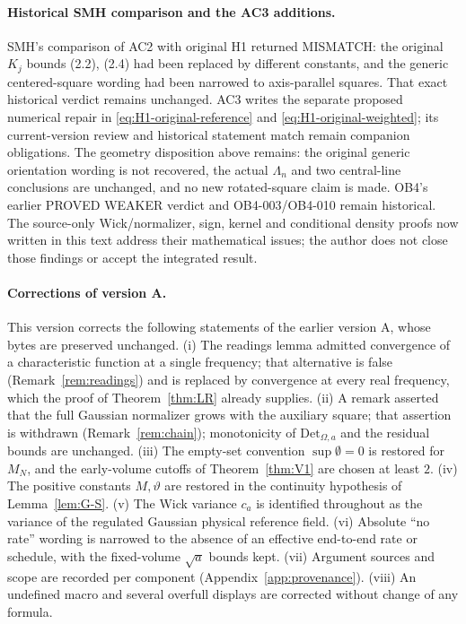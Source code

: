 \documentclass[11pt]{article}
\theoremstyle{plain}
\theoremstyle{definition}
\theoremstyle{remark}
\newcommand{\Det}{\mathrm{Det}}
\begin{document}
\paragraph{Historical SMH comparison and the AC3 additions.}
SMH's comparison of AC2 with original H1 returned MISMATCH: the original
$K_j$ bounds (2.2), (2.4) had been replaced by different constants, and
the generic centered-square wording had been narrowed to axis-parallel
squares. That exact historical verdict remains unchanged. AC3 writes the
separate proposed numerical repair in
\eqref{eq:H1-original-reference} and \eqref{eq:H1-original-weighted}; its
current-version review and historical statement match remain companion
obligations. The geometry disposition above remains: the original generic
orientation wording is not recovered, the actual $\Lambda_n$ and two
central-line conclusions are unchanged, and no new rotated-square claim
is made. OB4's earlier PROVED WEAKER verdict and OB4-003/OB4-010 remain
historical. The source-only Wick/normalizer, sign, kernel and conditional
density proofs now written in this text address their mathematical issues;
the author does not close those findings or accept the integrated result.

\paragraph{Corrections of version A.} This version corrects the following
statements of the earlier version A, whose bytes are preserved unchanged. (i) The
readings lemma admitted convergence of a characteristic function at a single
frequency; that alternative is false (Remark~\ref{rem:readings}) and is replaced by
convergence at every real frequency, which the proof of Theorem~\ref{thm:LR}
already supplies. (ii) A remark asserted that the full Gaussian normalizer grows
with the auxiliary square; that assertion is withdrawn
(Remark~\ref{rem:chain}); monotonicity of $\Det_{\Omega,a}$ and the residual bounds are
unchanged. (iii) The empty-set convention $\sup\emptyset=0$ is restored for $M_N$, and the
early-volume cutoffs of Theorem~\ref{thm:V1} are chosen at least $2$. (iv) The
positive constants $M,\vartheta$ are restored in the continuity hypothesis of
Lemma~\ref{lem:G-S}. (v) The Wick variance $c_a$ is identified throughout as the
variance of the regulated Gaussian physical reference field. (vi) Absolute
``no rate'' wording is narrowed to the absence of an effective end-to-end rate or
schedule, with the fixed-volume $\sqrt a$ bounds kept. (vii) Argument sources and
scope are recorded per component (Appendix~\ref{app:provenance}). (viii) An undefined macro
and several overfull displays are corrected without change of any formula.
\end{document}
